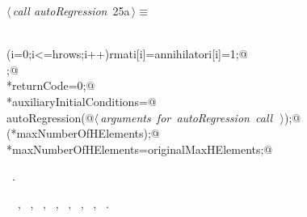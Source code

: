 \documentclass{article}
\begin{document}
\begin{flushleft} \small
\begin{minipage}{\linewidth}\label{scrap23}\raggedright\small
{} $\langle\,${\itshape call autoRegression}\nobreak\ {\footnotesize {25a}}$\,\rangle\equiv$
\vspace{-1ex}
\begin{list}{}{} \item
\mbox{}\verb@@\\
\mbox{}\verb@for(i=0;i<=hrows;i++){rmati[i]=annihilatori[i]=1;}@\\
\mbox{};@\\
\mbox{}\verb@*returnCode=0;@\\
\mbox{}\verb@*auxiliaryInitialConditions=@\\
\mbox{}\verb@    autoRegression(@\hbox{$\langle\,${\itshape arguments for autoRegression call}\nobreak\ {\footnotesize {}}$\,\rangle$}\verb@);@\\
\mbox{}\verb@bumpSparseAim(*maxNumberOfHElements);@\\
\mbox{}\verb@*maxNumberOfHElements=originalMaxHElements;@\\
\mbox{}\verb@@{\NWsep}
\end{list}
\vspace{-1.5ex}
\footnotesize
\begin{list}{}{\setlength{\itemsep}{-\parsep}\setlength{\itemindent}{-\leftmargin}}
\item \NWtxtMacroRefIn\ .
\item \NWtxtIdentsUsed\nobreak\  \verb@annihilatori@\nobreak\ , \verb@autoRegression@\nobreak\ , \verb@bumpSparseAim@\nobreak\ , \verb@hrows@\nobreak\ , \verb@i@\nobreak\ , \verb@maxNumberOfHElements@\nobreak\ , \verb@qmati@\nobreak\ , \verb@rmati@\nobreak\ .
\item{}
\end{list}
\end{minipage}\vspace{4ex}
\end{flushleft}
\end{document}
